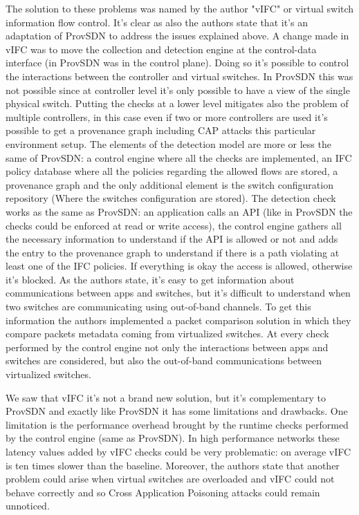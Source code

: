 \documentclass[a4paper,10pt]{memoir}
\begin{document}
The solution to these problems was named by the author "vIFC" or virtual switch information flow control. It's clear as also the authors state that it's an adaptation of ProvSDN to address the issues explained above. A change made in vIFC was to move the collection and detection engine at the control-data interface (in ProvSDN was in the control plane). Doing so it's possible to control the interactions between the controller and virtual switches. In ProvSDN this was not possible since at controller level it's only possible to have a view of the single physical switch. Putting the checks at a lower level mitigates also the problem of multiple controllers, in this case even if two or more controllers are used it's possible to get a provenance graph including CAP attacks this particular environment setup. The elements of the detection model are more or less the same of ProvSDN: a control engine where all the checks are implemented, an IFC policy database where all the policies regarding the allowed flows are stored, a provenance graph and the only additional element is the switch configuration repository (Where the switches configuration are stored). The detection check works as the same as ProvSDN: an application calls an API (like in ProvSDN the checks could be enforced at read or write access), the control engine gathers all the necessary information to understand if the API is allowed or not and adds the entry to the provenance graph to understand if there is a path violating at least one of the IFC policies. If everything is okay the access is allowed, otherwise it's blocked. As the authors state, it's easy to get information about communications between apps and switches, but it's difficult to understand when two switches are communicating using out-of-band channels. To get this information the authors implemented a packet comparison solution in which they compare packets metadata coming from virtualized switches. At every check performed by the control engine not only the interactions between apps and switches are considered, but also the out-of-band communications between virtualized switches.

We saw that vIFC it's not a brand new solution, but it's complementary to ProvSDN and exactly like ProvSDN it has some limitations and drawbacks. One limitation is the performance overhead brought by the runtime checks performed by the control engine (same as ProvSDN). In high performance networks these latency values added by vIFC checks could be very problematic: on average vIFC is ten times slower than the baseline. Moreover, the authors state that another problem could arise when virtual switches are overloaded and vIFC could not behave correctly and so Cross Application Poisoning attacks could remain unnoticed.
\end{document}
